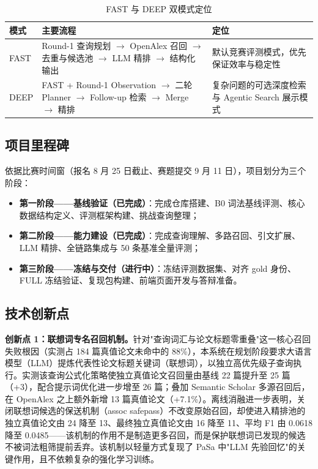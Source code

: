 \documentclass[11pt,a4paper,fontset=macnew]{ctexart}
\begin{document}
\begin{table}[H]
\centering
\caption{FAST 与 DEEP 双模式定位}
\label{tab:modes}
\small
\begin{tabular}{@{}llp{7.5cm}@{}}
\toprule
\textbf{模式} & \textbf{主要流程} & \textbf{定位} \\
\midrule
FAST & Round-1 查询规划 $\rightarrow$ OpenAlex 召回 $\rightarrow$ 去重与候选池 $\rightarrow$ LLM 精排 $\rightarrow$ 结构化输出 & 默认竞赛评测模式，优先保证效率与稳定性 \\
DEEP & FAST + Round-1 Observation $\rightarrow$ 二轮 Planner $\rightarrow$ Follow-up 检索 $\rightarrow$ Merge $\rightarrow$ 精排 & 复杂问题的可选深度检索与 Agentic Search 展示模式 \\
\bottomrule
\end{tabular}
\end{table}

\subsection{项目里程碑}
\label{sec:milestone}

依据比赛时间窗（报名 8 月 25 日截止、赛题提交 9 月 11 日），项目划分为三个阶段：

\begin{itemize}
  \item \textbf{第一阶段——基线验证（已完成）}：完成仓库搭建、B0 词法基线评测、核心数据结构定义、评测框架构建、挑战查询整理；
  \item \textbf{第二阶段——能力建设（已完成）}：完成查询理解、多路召回、引文扩展、LLM 精排、全链路集成与 50 条基准全量评测；
  \item \textbf{第三阶段——冻结与交付（进行中）}：冻结评测数据集、对齐 gold 身份、FULL 冻结验证、复现包构建、前端页面开发与答辩准备。
\end{itemize}

\subsection{技术创新点}
\label{sec:innovation}

\textbf{创新点 1：联想词专名召回机制。}针对"查询词汇与论文标题零重叠"这一核心召回失败根因（实测占 184 篇真值论文未命中的 88\%），本系统在规划阶段要求大语言模型（LLM）提炼代表性论文标题关键词（联想词），以独立高优先级子查询执行。实测该查询公式化策略使独立真值论文召回量由基线 22 篇提升至 25 篇（+3），配合提示词优化进一步增至 26 篇；叠加 Semantic Scholar 多源召回后，在 OpenAlex 之上额外新增 13 篇真值论文（+7.1\%）。离线消融进一步表明，关闭联想词候选的保送机制（assoc safepass）不改变原始召回，却使进入精排池的独立真值论文由 24 降至 13、最终独立真值论文由 16 降至 11、平均 F1 由 0.0618 降至 0.0485——该机制的作用不是制造更多召回，而是保护联想词已发现的候选不被词法粗筛提前丢弃。该机制以轻量方式复现了 PaSa 中"LLM 先验回忆"的关键作用，且不依赖复杂的强化学习训练。
\end{document}
